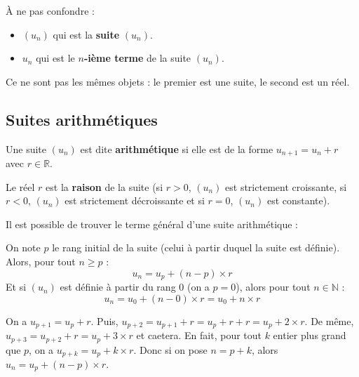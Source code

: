 	\begin{tip}
		À ne pas confondre :
		\begin{itemize}
			\item $(u_n)$ qui est la \textbf{suite} $(u_n)$.
			\item $u_n$ qui est le \textbf{$n$-ième terme} de la suite $(u_n)$.
		\end{itemize}
		Ce ne sont pas les mêmes objets : le premier est une suite, le second est un réel.
	\end{tip}
	
	\subsection{Suites arithmétiques}
	
	\begin{formula}[Définition]
		Une suite $(u_n)$ est dite \textbf{arithmétique} si elle est de la forme $u_{n+1} = u_n + r$ avec $r \in \mathbb{R}$.
	\end{formula}
	
	\begin{formula}[Raison]
		Le réel $r$ est la \textbf{raison} de la suite (si $r > 0$, $(u_n)$ est strictement croissante, si $r < 0$, $(u_n)$ est strictement décroissante et si $r = 0$, $(u_n)$ est constante).
	\end{formula}
	
	Il est possible de trouver le terme général d'une suite arithmétique :
	
	\begin{formula}
		On note $p$ le rang initial de la suite (celui à partir duquel la suite est définie). Alors, pour tout $n \geq p$ :
		\[ u_n = u_p + (n-p) \times r \]
		Et si $(u_n)$ est définie à partir du rang $0$ (on a $p = 0$), alors pour tout $n \in \mathbb{N}$ :
		\[ u_n = u_0 + (n-0) \times r = u_0 + n \times r \]
	\end{formula}
	
	\begin{demonstration}
		On a $u_{p+1} = u_p + r$. Puis, $u_{p+2} = u_{p+1} + r = u_p + r + r = u_p + 2 \times r$. De même, $u_{p+3} = u_{p+2} + r = u_p + 3 \times r$  et caetera.
		\newline
		En fait, pour tout $k$ entier plus grand que $p$, on a $u_{p+k} = u_p + k \times r$.
		\newline
		Donc si on pose $n = p+k$, alors $u_n = u_p + (n-p) \times r$.
	\end{demonstration}
	

